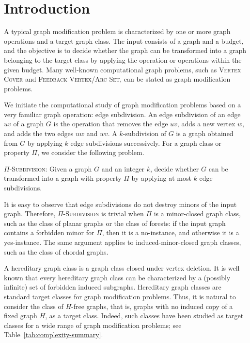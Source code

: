 \documentclass[a4paper,UKenglish,cleveref, autoref, thm-restate]{lipics-v2021}
\begin{document}
\newpage
\section{Introduction}

A typical graph modification problem is characterized by one or more graph operations and a target graph class.
The input consists of a graph and a budget, and the objective is to decide whether the graph can be transformed into a graph belonging to the target class by applying the operation or operations within the given budget.
Many well-known computational graph problems, such as \textsc{Vertex Cover} and \textsc{Feedback Vertex/Arc Set}, can be stated as graph modification problems.

We initiate the computational study of graph modification problems based on a very familiar graph operation: edge subdivision.
An edge subdivision of an edge $uv$ of a graph $G$ is the operation that removes the edge $uv$, adds a new vertex $w$, and adds the two edges $uw$ and $wv$.
A $k$-subdivision of $G$ is a graph obtained from $G$ by applying $k$ edge subdivisions successively.
For a graph class or property $\Pi$, we consider the following problem.

\medskip
\noindent
\textsc{$\Pi$-Subdivision}: Given a graph $G$ and an integer $k$, decide whether $G$ can be transformed into a graph with property $\Pi$ by applying at most $k$ edge subdivisions.

\medskip
It is easy to observe that edge subdivisions do not destroy minors of the input graph.
Therefore, \textsc{$\Pi$-Subdivision} is trivial when $\Pi$ is a minor-closed graph class, such as the class of planar graphs or the class of forests: if the input graph contains a forbidden minor for $\Pi$, then it is a no-instance, and otherwise it is a yes-instance.
The same argument applies to induced-minor-closed graph classes, such as the class of chordal graphs.

A hereditary graph class is a graph class closed under vertex deletion.
It is well known that every hereditary graph class can be characterized by a (possibly infinite) set of forbidden induced subgraphs.
Hereditary graph classes are standard target classes for graph modification problems.
Thus, it is natural to consider the class of $H$-free graphs, that is, graphs with no induced copy of a fixed graph $H$, as a target class.
Indeed, such classes have been studied as target classes for a wide range of graph modification problems; see Table~\ref{tab:complexity-summary}.
\end{document}
